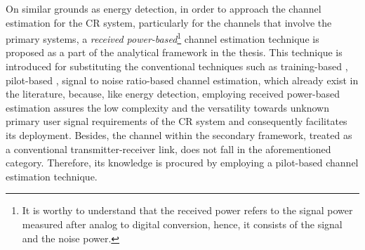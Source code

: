 On similar grounds as energy detection, in order to approach the channel estimation for the CR system, particularly for the channels that involve the primary systems, a \textit{received power-based}\footnote{It is worthy to understand that the received power refers to the signal power measured after analog to digital conversion, hence, it consists of the signal and the noise power.} channel estimation technique is proposed as a part of the analytical framework in the thesis. This technique is introduced for substituting the conventional techniques such as training-based \cite{Stoica03}, pilot-based \cite{Gifford05, Gifford08}, signal to noise ratio-based \cite{Chav11, Sharma13} channel estimation, which already exist in the literature, because, like energy detection, employing received power-based estimation assures the low complexity and the versatility towards unknown primary user signal requirements of the CR system and consequently facilitates its deployment. Besides, the channel within the secondary framework, treated as a conventional transmitter-receiver link, does not fall in the aforementioned category. Therefore, its knowledge is procured by employing a pilot-based channel estimation technique.

